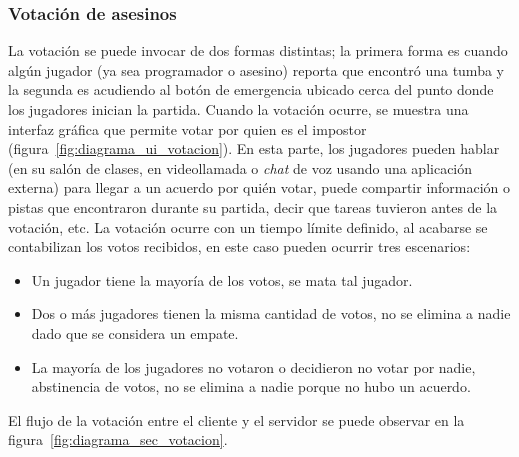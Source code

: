 \subsubsection{Votación de asesinos}
La votación se puede invocar de dos formas distintas; la primera forma es cuando algún jugador (ya sea programador o asesino) reporta que encontró una tumba y la segunda es acudiendo al botón de emergencia ubicado cerca del punto donde los jugadores inician la partida. Cuando la votación ocurre, se muestra una interfaz gráfica que permite votar por quien es el impostor (figura~\ref{fig:diagrama_ui_votacion}). En esta parte, los jugadores pueden hablar (en su salón de clases, en videollamada o \textit{chat} de voz usando una aplicación externa) para llegar a un acuerdo por quién votar, puede compartir información o pistas que encontraron durante su partida, decir que tareas tuvieron antes de la votación, etc. La votación ocurre con un tiempo límite definido, al acabarse se contabilizan los votos recibidos, en este caso pueden ocurrir tres escenarios:
\begin{itemize}
    \item Un jugador tiene la mayoría de los votos, se mata tal jugador.
    \item Dos o más jugadores tienen la misma cantidad de votos, no se elimina a nadie dado que se considera un empate.
    \item La mayoría de los jugadores no votaron o decidieron no votar por nadie, abstinencia de votos, no se elimina a nadie porque no hubo un acuerdo.
\end{itemize}
El flujo de la votación entre el cliente y el servidor se puede observar en la figura~\ref{fig:diagrama_sec_votacion}.

